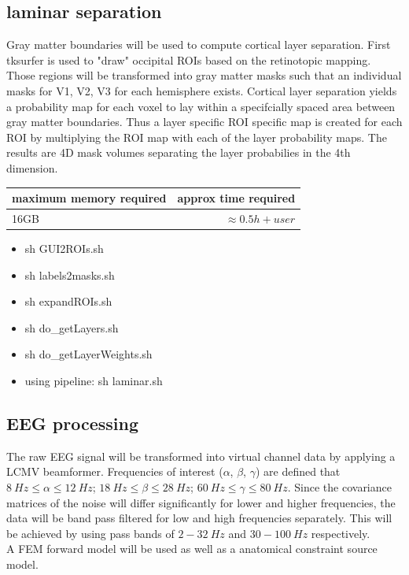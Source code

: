 \documentclass[12pt,a4paper]{scrartcl}
\begin{document}
\subsection{laminar separation}
Gray matter boundaries will be used to compute cortical layer separation. First tksurfer is used to "draw" occipital ROIs based on the retinotopic mapping. Those regions will be transformed into gray matter masks such that an individual masks for V1, V2, V3 for each hemisphere exists. Cortical layer separation yields a probability map for each voxel to lay within a specifcially spaced area between gray matter boundaries. Thus a layer specific ROI specific map is created for each ROI by multiplying the ROI map with each of the layer probability maps. The results are 4D mask volumes separating the layer probabilies in the 4th dimension.
\begin{table}[h]
\begin{tabular}{l | r}
\toprule
maximum memory required & approx time required\\\toprule
16GB & $\approx 0.5h+user$ \\\bottomrule
\end{tabular}
\end{table}
\begin{itemize}
\item sh GUI2ROIs.sh
\item sh labels2masks.sh
\item sh expandROIs.sh
\item sh do\_getLayers.sh
\item sh do\_getLayerWeights.sh
\item using pipeline: sh laminar.sh
\end{itemize}

\subsection{EEG processing}
The raw EEG signal will be transformed into virtual channel data by applying a LCMV beamformer. Frequencies of interest ($\alpha$, $\beta$, $\gamma$) are defined that $8~Hz \leq \alpha \leq 12~Hz$; $18~Hz \leq \beta \leq 28~Hz$; $60~Hz \leq \gamma \leq 80~Hz$. Since the covariance matrices of the noise will differ significantly for lower and higher frequencies, the data will be band pass filtered for low and high frequencies separately. This will be achieved by using pass bands of $2-32~Hz$ and $30-100~Hz$ respectively.\\
A FEM forward model will be used as well as a anatomical constraint source model.\\
\end{document}
